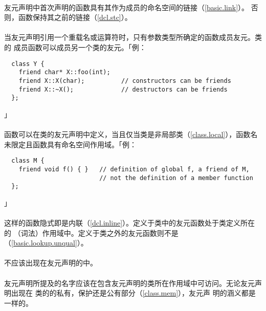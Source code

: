 \paragraph{}
友元声明中首次声明的函数具有其作为成员的命名空间的链接（\ref{basic.link}）。
否则，函数保持其之前的链接（\ref{dcl.stc}）。

\paragraph{}
当友元声明引用一个重载名或运算符时，只有参数类型所确定的函数成员友元。类的
成员函数可以成员另一个类的友元。「例：
\begin{lstlisting}
  class Y {
    friend char* X::foo(int);
    friend X::X(char);          // constructors can be friends
    friend X::~X();             // destructors can be friends
  };
\end{lstlisting}」

\paragraph{}
函数可以在类的友元声明中定义，当且仅当类是非局部类（\ref{class.local}），函数名
未限定且函数具有命名空间作用域。「例：
\begin{lstlisting}
  class M {
    friend void f() { }   // definition of global f, a friend of M,
                          // not the definition of a member function
  };
\end{lstlisting}」

\paragraph{}
这样的函数隐式即是内联（\ref{dcl.inline}）。定义于类中的友元函数处于类定义所在的
（词法）作用域中。定义于类之外的友元函数则不是（\ref{basic.lookup.unqual}）。

\paragraph{}
不应该出现在友元声明的中。

\paragraph{}
友元声明所提及的名字应该在包含友元声明的类所在作用域中可访问。无论友元声明出现在
类的的私有，保护还是公有部分（\ref{class.mem}），友元声
明的涵义都是一样的。

